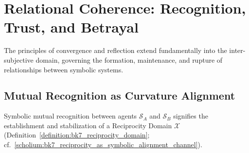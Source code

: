 \section{Relational Coherence: Recognition, Trust, and Betrayal}
\label{sec:bk9_recognition_trust_and_betrayal}
The principles of convergence and reflection extend fundamentally into the inter-subjective domain, governing the formation, maintenance, and rupture of relationships between symbolic systems.
\subsection{Mutual Recognition as Curvature Alignment}
\label{subsec:bk9_mutual_recognition_as_curvature_alignment}
Symbolic mutual recognition between agents $\mathcal{S}_A$ and $\mathcal{S}_B$ signifies the establishment and stabilization of a Reciprocity Domain $\mathcal{X}$ (Definition~\ref{definition:bk7_reciprocity_domain}; cf.~\ref{scholium:bk7_reciprocity_as_symbolic_alignment_channel}).

